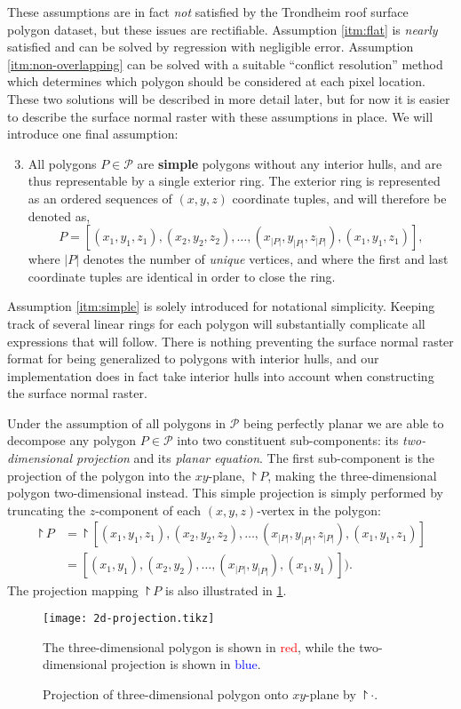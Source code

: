 These assumptions are in fact \emph{not} satisfied by the Trondheim roof surface polygon dataset, but these issues are rectifiable.
Assumption \ref{itm:flat} is \textit{nearly} satisfied and can be solved by regression with negligible error.
Assumption \ref{itm:non-overlapping} can be solved with a suitable \enquote{conflict resolution} method which determines which polygon should be considered at each pixel location.
These two solutions will be described in more detail later, but for now it is easier to describe the surface normal raster with these assumptions in place.
We will introduce one final assumption:
\begin{enumerate}
  \setcounter{enumi}{2}
  \item \label{itm:simple} All polygons $P \in \mathcal{P}$ are \textbf{simple} polygons without any interior hulls, and are thus representable by a single exterior ring.
   The exterior ring is represented as an ordered sequences of $(x, y, z)$ coordinate tuples, and will therefore be denoted as,
    \begin{equation*}
      P = [(x_1, y_1, z_1), (x_2, y_2, z_2), \dots, (x_{|P|}, y_{|P|}, z_{|P|}), (x_1, y_1, z_1)],
    \end{equation*}
    where $|P|$ denotes the number of \emph{unique} vertices, and where the first and last coordinate tuples are identical in order to close the ring.
\end{enumerate}
Assumption \ref{itm:simple} is solely introduced for notational simplicity.
Keeping track of several linear rings for each polygon will substantially complicate all expressions that will follow.
There is nothing preventing the surface normal raster format for being generalized to polygons with interior hulls, and our implementation does in fact take interior hulls into account when constructing the surface normal raster.

Under the assumption of all polygons in $\mathcal{P}$ being perfectly planar we are able to decompose any polygon $P \in \mathcal{P}$ into two constituent sub-components: its \textit{two-dimensional projection} and its \textit{planar equation}.
The first sub-component is the projection of the polygon into the $xy$-plane, $\project{P}$, making the three-dimensional polygon two-dimensional instead.
This simple projection is simply performed by truncating the $z$-component of each $(x, y, z)$-vertex in the polygon:
\begin{align*}
  \project{P}
  &=
  \project{[(x_1, y_1, z_1), (x_2, y_2, z_2), \dots, (x_{|P|}, y_{|P|}, z_{|P|}), (x_1, y_1, z_1)]}
  \\
  &=
  [(x_1, y_1), (x_2, y_2), \dots, (x_{|P|}, y_{|P|}), (x_1, y_1)]).
\end{align*}
The projection mapping $\project{P}$ is also illustrated in \cref{fig:2d-polygon-projection}.
\begin{figure}
  \centering
  \texttt{[image: 2d-projection.tikz]}
  \caption{%
    Projection of three-dimensional polygon onto $xy$-plane by $\project{\cdot}$.
  }{%
    The three-dimensional polygon is shown in \textcolor{red}{red}, while the two-dimensional projection is shown in \textcolor{blue}{blue}.
  }%
  \label{fig:2d-polygon-projection}
\end{figure}

